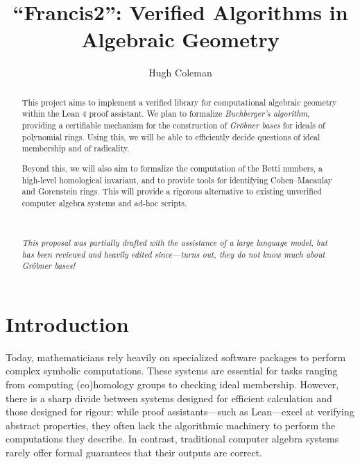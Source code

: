 \documentclass[acmsmall,nonacm,screen]{acmart}
\begin{document}
\title{``Francis2'': Verified Algorithms in Algebraic Geometry}

\author{Hugh Coleman}

\renewcommand{\shortauthors}{Coleman}

\newcommand{\Groebner}{Gr{\"o}bner}

\begin{abstract}
This project aims to implement a verified library for computational algebraic geometry within the Lean 4 proof assistant.
We plan to formalize {\it Buchberger's algorithm}, providing a certifiable mechanism for the construction of {\it \Groebner{} bases} for ideals of polynomial rings.
Using this, we will be able to efficiently decide questions of ideal membership and of radicality.

Beyond this, we will also aim to formalize the computation of the Betti numbers, a high-level homological invariant, and to provide tools for identifying Cohen--Macaulay and Gorenstein rings.
This will provide a rigorous alternative to existing unverified computer algebra systems and ad-hoc scripts.

\

\noindent\it\color{red}
This proposal was partially drafted with the assistance of a large language model, but has been reviewed and heavily edited since---turns out, they do not know much about \Groebner{} bases!
\end{abstract}

\maketitle

\section{Introduction}

Today, mathematicians rely heavily on specialized software packages to perform complex symbolic computations.
These systems are essential for tasks ranging from computing (co)homology groups to checking ideal membership.
However, there is a sharp divide between systems designed for efficient calculation and those designed for rigour: while proof assistants---such as Lean---excel at verifying abstract properties, they often lack the algorithmic machinery to perform the computations they describe.
In contrast, traditional computer algebra systems rarely offer formal guarantees that their outputs are correct.
\end{document}
